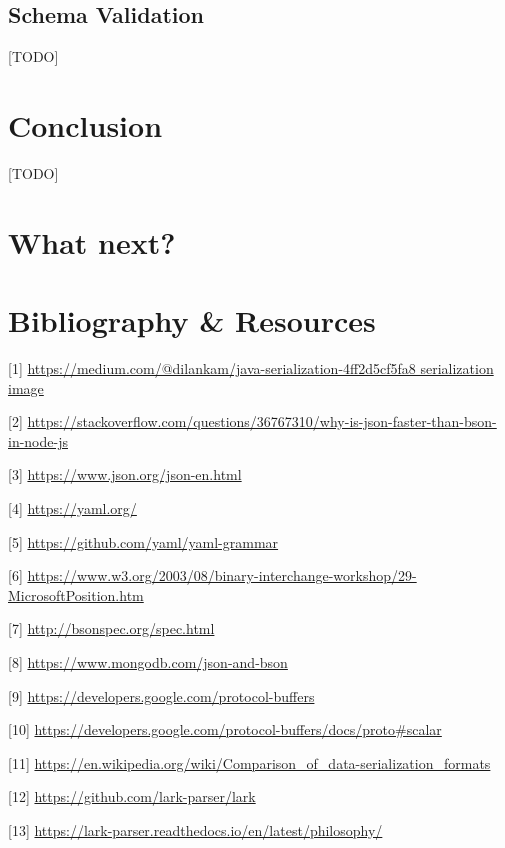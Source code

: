 \documentclass[12pt]{article}
\begin{document}
\subsection{Schema Validation}
[TODO]

\pagebreak

\section{Conclusion}
[TODO]

\pagebreak

\section{What next?}

\pagebreak

\section{Bibliography \& Resources}
[1] \url{https://medium.com/@dilankam/java-serialization-4ff2d5cf5fa8 serialization image}
 
[2] \url{https://stackoverflow.com/questions/36767310/why-is-json-faster-than-bson-in-node-js} 

[3] \url{https://www.json.org/json-en.html} 

[4] \url{https://yaml.org/} 

[5] \url{https://github.com/yaml/yaml-grammar} 

[6] \url{https://www.w3.org/2003/08/binary-interchange-workshop/29-MicrosoftPosition.htm} 

[7] \url{http://bsonspec.org/spec.html} 

[8] \url{https://www.mongodb.com/json-and-bson} 

[9] \url{https://developers.google.com/protocol-buffers} 

[10] \url{https://developers.google.com/protocol-buffers/docs/proto#scalar} 

[11] \url{https://en.wikipedia.org/wiki/Comparison_of_data-serialization_formats}

[12] \url{https://github.com/lark-parser/lark}

[13] \url{https://lark-parser.readthedocs.io/en/latest/philosophy/}
\end{document}
